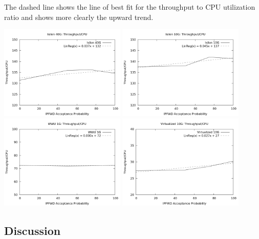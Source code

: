 \documentclass[journal]{IEEEtran}
\begin{document}
    The dashed line shows the line of best fit for the throughput to CPU
    utilization ratio and shows more clearly the upward trend.
    
    \begin{center}
      \includegraphics[width=0.45\textwidth]{toc_isilon40}
      \includegraphics[width=0.45\textwidth]{toc_isilon10}
      \includegraphics[width=0.45\textwidth]{toc_wwu1}
      \includegraphics[width=0.45\textwidth]{toc_virtual10}
    \end{center}


  \subsection{Discussion} 
\end{document}
